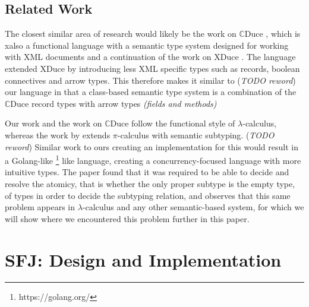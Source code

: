 \documentclass{l4proj}
\begin{document}
\section{Related Work}
The closest similar area of research would likely be the work on $\mathbb{C}$Duce
\citep{Benzaken2003}, which is xalso a functional language with a semantic type system designed for
working with XML documents and a continuation of the work on XDuce \citep{Hosoya2003}. The language
extended XDuce by introducing less XML specific types such as records, boolean connectives and arrow
types. This therefore makes it similar to (\textit{TODO reword}) our language in that a class-based
semantic type system is a combination of the $\mathbb{C}$Duce record types with arrow types
\textit{(fields and methods)}

Our work and the work on $\mathbb{C}$Duce follow the functional style of $\lambda$-calculus,
whereas the work by \citet{Castagna2008} extends $\pi$-calculus with semantic subtyping.
(\textit{TODO reword}) Similar work to ours creating an implementation for this would result in a
Golang-like \footnote{https://golang.org/} like language, creating a concurrency-focused language with more
intuitive types. The paper found that it was required to be able to decide and resolve the atomicy,
that is whether the only proper subtype is the empty type, of types in order to decide the subtyping
relation, and observes that this same problem appears in $\lambda$-calculus and any other
semantic-based system, for which we will show where we encountered this problem further in this
paper.



\chapter{SFJ: Design and Implementation}
\end{document}
